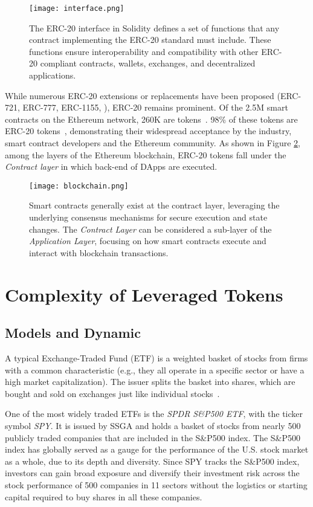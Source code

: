 \begin{figure}[t]
	\centering
	\texttt{[image: interface.png]}
	\caption[The ERC-20 interface in Solidity]{The ERC-20 interface in Solidity defines a set of functions that any contract implementing the ERC-20 standard must include. These functions ensure interoperability and compatibility with other ERC-20 compliant contracts, wallets, exchanges, and decentralized applications.}
	\label{fig:interface}
\end{figure}

While numerous ERC-20 extensions or replacements have been proposed (\eg ERC-721, ERC-777, ERC-1155, \etc), ERC-20 remains prominent. Of the 2.5M smart contracts on the Ethereum network, 260K are tokens~\cite{TokenTracker}. 98\% of these tokens are ERC-20 tokens~\cite{TokenTracker}, demonstrating their widespread acceptance by the industry, smart contract developers and the Ethereum community. As shown in Figure \ref{fig:layers}, among the layers of the Ethereum blockchain, ERC-20 tokens fall under the \textit{Contract layer} in which back-end of DApps are executed.

\begin{figure}[t]
	\centering
	\texttt{[image: blockchain.png]}
	\caption[Ethereum layers and Smart Contract execution]{Smart contracts generally exist at the contract layer, leveraging the underlying consensus mechanisms for secure execution and state changes. The \textit{Contract Layer} can be considered a sub-layer of the \textit{Application Layer}, focusing on how smart contracts execute and interact with blockchain transactions.}
	\label{fig:layers}
\end{figure}

\section{Complexity of Leveraged Tokens}
\subsection{Models and Dynamic}
A typical Exchange-Traded Fund (ETF) is a weighted basket of stocks from firms with a common characteristic (e.g., they all operate in a specific sector or have a high market capitalization). The issuer splits the basket into shares, which are bought and sold on exchanges just like individual stocks~\cite{liebi2020effect}.
\begin{example}
	One of the most widely traded ETFs is the \textsl{SPDR S\&P500 ETF}, with the ticker symbol \textsl{SPY}. It is issued by SSGA and holds a basket of stocks from nearly 500 publicly traded companies that are included in the S\&P500 index. The S\&P500 index has globally served as a gauge for the performance of the U.S. stock market as a whole, due to its depth and diversity. Since SPY tracks the S\&P500 index, investors can gain broad exposure and diversify their investment risk across the stock performance of 500 companies in 11 sectors without the logistics or starting capital required to buy shares in all these companies.
\end{example}

